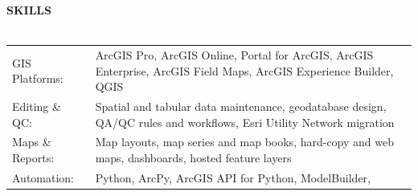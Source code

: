 \documentclass[letterpaper]{article}
\newcommand{\lineunder} {
        \vspace*{-8pt} \\
        \hspace*{-18pt} \hrulefill \\
    }
\newcommand{\header} [1] {
        \vspace{9pt}
        {\hspace*{-18pt}\vspace*{6pt} \large \textbf {#1}}
        \vspace*{-6pt} \lineunder
        \vspace{2pt}
    }
\newenvironment{skillslist}
        {
            \hspace*{-0.07in}\begin{tabular}[t]{ l L{4.92in} }
        }{
            \end{tabular}
        }
\begin{document}
\header{SKILLS}
    \begin{skillslist}
        GIS Platforms:&
            ArcGIS Pro, ArcGIS Online, Portal for ArcGIS, ArcGIS Enterprise, \linebreak
            ArcGIS Field Maps, ArcGIS Experience Builder, QGIS
            \\[15pt]
        Editing \& QC:&
            Spatial and tabular data maintenance, geodatabase design, \linebreak
            QA/QC rules and workflows, Esri Utility Network migration
            \\[15pt]
        Maps \& Reports:&
            Map layouts, map series and map books, hard-copy and web maps, \linebreak
            dashboards, hosted feature layers
            \\[15pt]
        Automation:&
            Python, ArcPy, ArcGIS API for Python, ModelBuilder, \linebreak

\end{skillslist}
\end{document}

